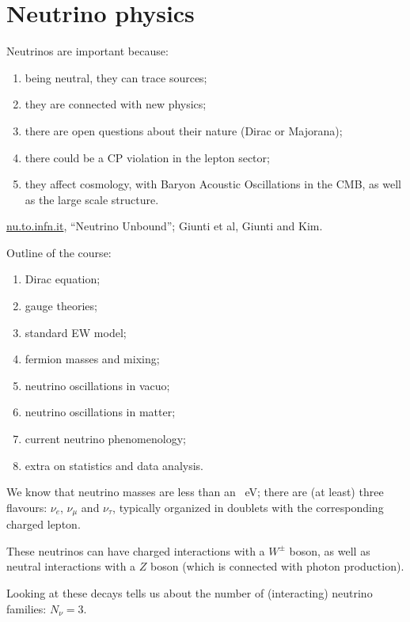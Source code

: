 \documentclass[main.tex]{subfiles}
\begin{document}
\section{Neutrino physics}


Neutrinos are important because:
\begin{enumerate}
    \item being neutral, they can trace sources; 
    \item they are connected with new physics;
    \item there are open questions about their nature (Dirac or Majorana);
    \item there could be a CP violation in the lepton sector;
    \item they affect cosmology, with Baryon Acoustic Oscillations in the CMB, 
    as well as the large scale structure.
\end{enumerate}

\url{nu.to.infn.it}, ``Neutrino Unbound''; Giunti et al, Giunti and Kim. 

Outline of the course: 
\begin{enumerate}
    \item Dirac equation; 
    \item gauge theories;
    \item standard EW model; 
    \item fermion masses and mixing;
    \item neutrino oscillations in vacuo;
    \item neutrino oscillations in matter;
    \item current neutrino phenomenology;
    \item extra on statistics and data analysis. 
\end{enumerate}

We know that neutrino masses are less than an \SI{}{eV}; 
there are (at least) three flavours: \(\nu _e\), \(\nu _\mu \) and \(\nu _\tau \), 
typically organized in doublets with the corresponding charged lepton. 

These neutrinos can have charged interactions with a \(W^{\pm}\) boson, 
as well as neutral interactions with a \(Z\) boson
(which is connected with photon production). 

Looking at these decays tells us about the number of (interacting) neutrino families: \(N_\nu = 3\). 
\end{document}
